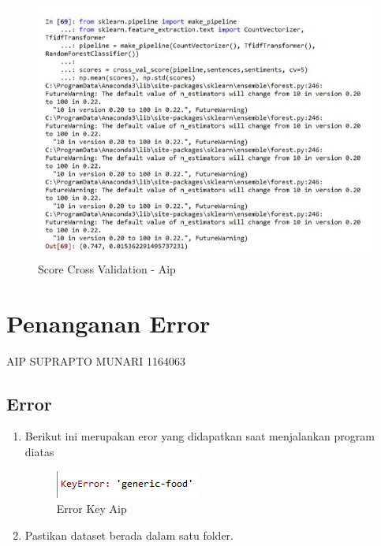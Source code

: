 \begin{figure}[!hbtp]
\centering
\includegraphics[scale=0.3]{figures/AIP/e34.PNG}
\caption{Score Cross Validation - Aip}
\label{Score Cross Validation - Aip}
\end{figure}

\section{Penanganan Error}
AIP SUPRAPTO MUNARI 1164063
\subsection{Error}
\begin{enumerate}
	\item
Berikut ini merupakan eror yang didapatkan saat menjalankan program diatas
\begin{figure}[!hbtp]
\centering
\includegraphics[scale=0.5]{figures/AIP/errorc1.PNG}
\caption{Error Key Aip }
\label{Error}
\end{figure}
\item
Pastikan dataset berada dalam satu folder.
\end{enumerate}









